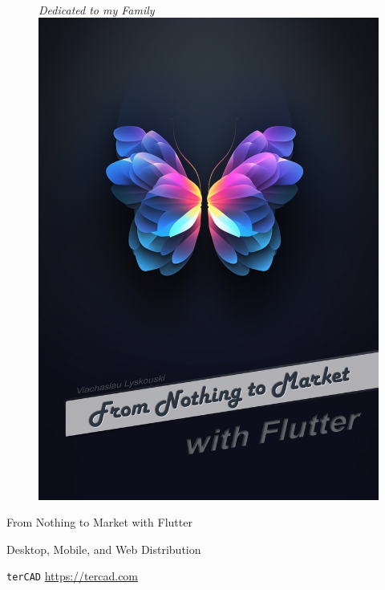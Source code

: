 
\thispagestyle{empty}

\begin{figure}
  \begin{minipage}{0.5\textwidth}
    ~
  \end{minipage}
  \hfill
  \begin{minipage}{0.4\textwidth}
    \emph{Dedicated to my Family}\\
    \includegraphics[width=\textwidth]{_cover/main.png}
  \end{minipage}
\end{figure}

\vspace{2mm}
\noindent \large From Nothing to Market with Flutter

\vspace{2mm}
\noindent \small Desktop, Mobile, and Web Distribution

\vspace{100mm}




\vspace{60mm}

\noindent \texttt{terCAD} \href{https://tercad.com}{https://tercad.com}